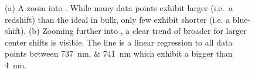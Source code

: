 		\begin{figure}[!htb]
			\begin{subfigure}{.5\textwidth}
				\centering
				\caption{}
				\label{subfig::distro_inset1}
			\end{subfigure}
			\begin{subfigure}{.5\textwidth}
				\centering
				\caption{}
				\label{subfig::distro_inset2}
			\end{subfigure}
			\caption[Zoom-in onto \sivs of the \vl]{(a) A zoom into \vl. While many data points exhibit larger \cwls (i.e.\ a redshift) than the ideal \siv in bulk, only few exhibit shorter \cwls (i.e. a blue-shift). (b) Zooming further into \vl, a clear trend of broader \ZPL \lws for larger \ZPL center shifts is visible. The line is a linear regression to all data points between \SIlist{737;741}{\nano\meter} which exhibit a \lw bigger than \SI{4}{\nano\meter}.}
			\label{fig::bimodal_distr_zoom}
		\end{figure}

